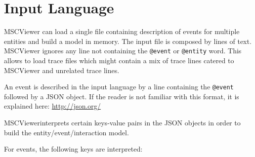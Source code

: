 \documentclass[11pt, twoside, titlepage]{book}
\makeatletter
\newcommand{\prog}{MSCViewer}
\newcommand{\mscevent}{\texttt{@event}}
\newcommand{\mscentity}{\texttt{@entity}}
\makeatother
\begin{document}
\section{Input Language}
\prog{} can load a single file containing description of events for multiple
entities and build a model in memory. The input file is composed by lines of
text. \prog{} ignores any line not containing the \mscevent{} or
\mscentity{} word. This allows to load trace files which might contain
a mix of trace lines catered to \prog{} and unrelated trace lines.

An event is described in the input language by a line containing the
\mscevent{} followed by a JSON object. If the reader is not familiar
with this format, it is explained here: \href{http://json.org/}{http://json.org/}
   
\prog interprets certain keys-value pairs in the JSON objects in order to build
the entity/event/interaction model. 

For events, the following keys are interpreted:
 
\end{document}

